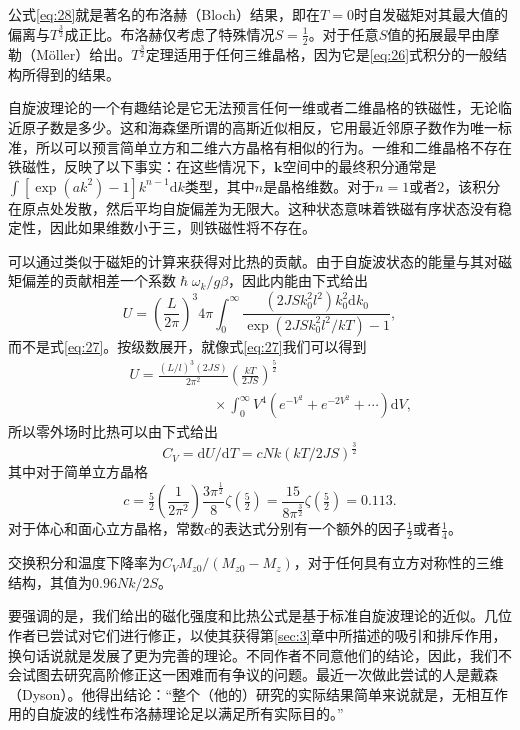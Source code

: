 \documentclass{article}
\begin{document}
公式\eqref{eq:28}就是著名的布洛赫（Bloch）结果，即在$T=0$时自发磁矩对其最大值的偏离与$T^\frac{3}{2}$成正比。布洛赫仅考虑了特殊情况$S=\tfrac{1}{2}$。对于任意$S$值的拓展最早由摩勒（M\"oller）给出。$T^\frac{3}{2}$定理适用于任何三维晶格，因为它是\eqref{eq:26}式积分的一般结构所得到的结果。

自旋波理论的一个有趣结论是它无法预言任何一维或者二维晶格的铁磁性，无论临近原子数是多少。这和海森堡所谓的高斯近似相反，它用最近邻原子数作为唯一标准，所以可以预言简单立方和二维六方晶格有相似的行为。一维和二维晶格不存在铁磁性，反映了以下事实：在这些情况下，$\mathbf{k}$空间中的最终积分通常是$\int[\exp(ak^2)-1]k^{n-1}\mathrm{d}k$类型，其中$n$是晶格维数。对于$n=1$或者$2$，该积分在原点处发散，然后平均自旋偏差为无限大。这种状态意味着铁磁有序状态没有稳定性，因此如果维数小于三，则铁磁性将不存在。

可以通过类似于磁矩的计算来获得对比热的贡献。由于自旋波状态的能量与其对磁矩偏差的贡献相差一个系数$\hslash\omega_k/g\beta$，因此内能由下式给出
\begin{equation} \label{eq:29}
U=\left(\frac{L}{2\pi}\right)^3 4\pi\int_0^\infty\frac{(2JSk_0^2l^2)k_0^2\mathrm{d}k_0}{\exp(2JSk_0^2l^2/kT)-1},
\end{equation}
而不是式\eqref{eq:27}。按级数展开，就像式\eqref{eq:27}我们可以得到
\begin{eqnarray} \label{eq:30}
&&U=\frac{(L/l)^3(2JS)}{2\pi^2}\left(\frac{kT}{2JS}\right)^{\frac{5}{2}}\nonumber\\
&&\phantom{~~~~~~~~~~~~~~~~~~~~~~~~~~~}\times\int_0^\infty V^4(e^{-V^2}+e^{-2V^2}+\cdots)\mathrm{d}V,
\end{eqnarray}
所以零外场时比热可以由下式给出
\begin{equation} \label{eq:31}
C_V=\mathrm{d}U/\mathrm{d}T=cNk(kT/2JS)^{\frac{3}{2}}
\end{equation}
其中对于简单立方晶格
\begin{equation} \label{eq:32}
c=\tfrac{5}{2}\left(\frac{1}{2\pi^2}\right)\frac{3\pi^{\frac{1}{2}}}{8}\zeta(\tfrac{5}{2})=\frac{15}{8\pi^{\frac{3}{2}}}\zeta(\tfrac{5}{2})=0.113.
\end{equation}
对于体心和面心立方晶格，常数$c$的表达式分别有一个额外的因子$\tfrac{1}{2}$或者$\tfrac{1}{4}$。

交换积分和温度下降率为$C_VM_{z0}/(M_{z0}-M_z)$，对于任何具有立方对称性的三维结构，其值为$0.96Nk/2S$。

要强调的是，我们给出的磁化强度和比热公式是基于标准自旋波理论的近似。几位作者已尝试对它们进行修正，以使其获得第\ref{sec:3}章中所描述的吸引和排斥作用，换句话说就是发展了更为完善的理论。不同作者不同意他们的结论，因此，我们不会试图去研究高阶修正这一困难而有争议的问题。最近一次做此尝试的人是戴森（Dyson）。他得出结论：“整个（他的）研究的实际结果简单来说就是，无相互作用的自旋波的线性布洛赫理论足以满足所有实际目的。”
\end{document}
